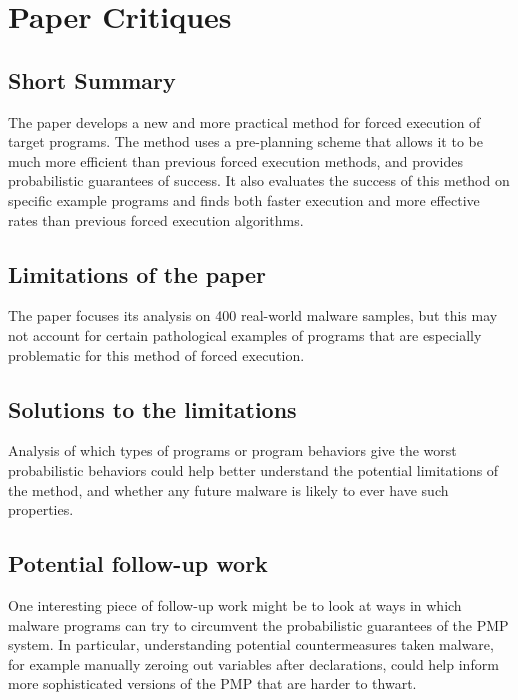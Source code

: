 \documentclass[11pt]{article}
\begin{document}
\section*{Paper Critiques}

\subsection*{Short Summary}

The paper develops a new and more practical method for forced execution of target programs.
The method uses a pre-planning scheme that allows it to be much more efficient than previous forced execution methods, and provides probabilistic guarantees of success.
It also evaluates the success of this method on specific example programs and finds both faster execution and more effective rates than previous forced execution algorithms.

\subsection*{Limitations of the paper}

The paper focuses its analysis on 400 real-world malware samples, but this may not account for certain pathological examples of programs that are especially problematic for this method of forced execution.

\subsection*{Solutions to the limitations}

Analysis of which types of programs or program behaviors give the worst probabilistic behaviors could help better understand the potential limitations of the method, and whether any future malware is likely to ever have such properties.

\subsection*{Potential follow-up work}

One interesting piece of follow-up work might be to look at ways in which malware programs can try to circumvent the probabilistic guarantees of the PMP system.
In particular, understanding potential countermeasures taken malware, for example manually zeroing out variables after declarations, could help inform more sophisticated versions of the PMP that are harder to thwart.
\end{document}
